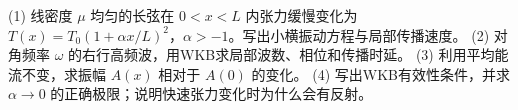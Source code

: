 (1) 线密度 \(\mu\) 均匀的长弦在 \(0<x<L\) 内张力缓慢变化为 \(T(x)=T_0(1+\alpha x/L)^2\)，\(\alpha>-1\)。写出小横振动方程与局部传播速度。
(2) 对角频率 \(\omega\) 的右行高频波，用WKB求局部波数、相位和传播时延。
(3) 利用平均能流不变，求振幅 \(A(x)\) 相对于 \(A(0)\) 的变化。
(4) 写出WKB有效性条件，并求 \(\alpha\to0\) 的正确极限；说明快速张力变化时为什么会有反射。
